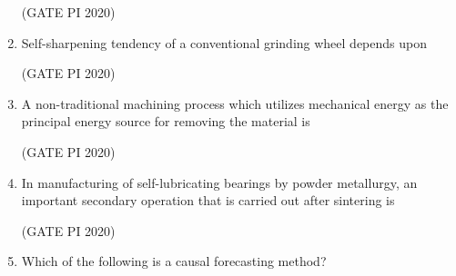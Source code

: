 \documentclass[journal,12pt,onecolumn]{IEEEtran}
\theoremstyle{remark}
\begin{document}
\begin{enumerate}
\hfill (GATE PI 2020)

\item Self-sharpening tendency of a conventional grinding wheel depends upon
\begin{enumerate}
\end{enumerate}

\hfill (GATE PI 2020)

\item A non-traditional machining process which utilizes mechanical energy as the principal energy source for removing the material is
\begin{enumerate}
\end{enumerate}

\hfill (GATE PI 2020)

\item In manufacturing of self-lubricating bearings by powder metallurgy, an important secondary operation that is carried out after sintering is
\begin{enumerate}
\end{enumerate}

\hfill (GATE PI 2020)

\item Which of the following is a causal forecasting method?
\begin{enumerate}
\end{enumerate}


\end{enumerate}
\end{document}
